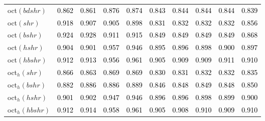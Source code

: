 \begin{tabular}[t]{>{\centering\arraybackslash}m{2.5cm}ccccccccc}
oct$(bdshr)$ & \textcolor{black}{0.862} & \textcolor{black}{0.861} & \textcolor{black}{0.876} & \textcolor{black}{0.874} & \textcolor{black}{0.843} & \textcolor{black}{0.844} & \textcolor{black}{0.844} & \textcolor{black}{0.844} & \textcolor{black}{0.839}\\
oct$(shr)$ & \textcolor{black}{0.918} & \textcolor{black}{0.907} & \textcolor{black}{0.905} & \textcolor{black}{0.898} & \textcolor{black}{0.831} & \textcolor{black}{0.832} & \textcolor{black}{0.832} & \textcolor{black}{0.832} & \textcolor{black}{0.856}\\
oct$(bshr)$ & \textcolor{black}{0.924} & \textcolor{black}{0.928} & \textcolor{black}{0.911} & \textcolor{black}{0.915} & \textcolor{black}{0.849} & \textcolor{black}{0.849} & \textcolor{black}{0.849} & \textcolor{black}{0.849} & \textcolor{black}{0.868}\\
oct$(hshr)$ & \textcolor{black}{0.904} & \textcolor{black}{0.901} & \textcolor{black}{0.957} & \textcolor{black}{0.946} & \textcolor{black}{0.895} & \textcolor{black}{0.896} & \textcolor{black}{0.898} & \textcolor{black}{0.900} & \textcolor{black}{0.897}\\
oct$(hbshr)$ & \textcolor{black}{0.912} & \textcolor{black}{0.913} & \textcolor{black}{0.956} & \textcolor{black}{0.961} & \textcolor{black}{0.905} & \textcolor{black}{0.909} & \textcolor{black}{0.909} & \textcolor{black}{0.911} & \textcolor{black}{0.910}\\
oct$_h(shr)$ & \textcolor{black}{0.866} & \textcolor{black}{0.863} & \textcolor{black}{0.869} & \textcolor{black}{0.869} & \textcolor{black}{0.830} & \textcolor{black}{0.831} & \textcolor{black}{0.832} & \textcolor{black}{0.832} & \textcolor{black}{0.835}\\
oct$_h(bshr)$ & \textcolor{black}{0.882} & \textcolor{black}{0.886} & \textcolor{black}{0.886} & \textcolor{black}{0.889} & \textcolor{black}{0.846} & \textcolor{black}{0.848} & \textcolor{black}{0.849} & \textcolor{black}{0.848} & \textcolor{black}{0.850}\\
oct$_h(hshr)$ & \textcolor{black}{0.901} & \textcolor{black}{0.902} & \textcolor{black}{0.947} & \textcolor{black}{0.946} & \textcolor{black}{0.896} & \textcolor{black}{0.896} & \textcolor{black}{0.898} & \textcolor{black}{0.899} & \textcolor{black}{0.900}\\
oct$_h(hbshr)$ & \textcolor{black}{0.912} & \textcolor{black}{0.914} & \textcolor{black}{0.958} & \textcolor{black}{0.961} & \textcolor{black}{0.905} & \textcolor{black}{0.908} & \textcolor{black}{0.910} & \textcolor{black}{0.909} & \textcolor{black}{0.910}\\
\bottomrule
\end{tabular}
